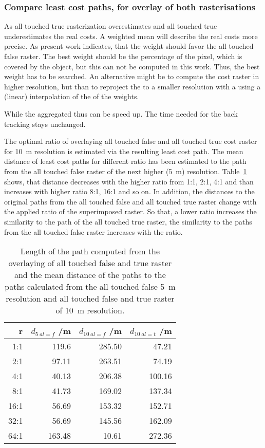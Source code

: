 \subsubsection{Compare least cost paths, for overlay of both rasterisations}

As all touched true rasterization overestimates and all touched true underestimates the real costs.
A weighted mean will describe the real costs more precise.
As present work indicates, that the weight should favor the all touched false raster.
The best weight should be the percentage of the pixel, which is covered by the object, but this can not be computed in this work.
Thus, the best weight has to be searched.
An alternative might be to compute the cost raster in higher resolution, but than to reproject the to a smaller resolution with a using a (linear) interpolation of the of the weights.

While the aggregated thus can be speed up.
The time needed for the back tracking stays unchanged.

The optimal ratio of overlaying all touched false and all touched true cost raster for 10~m resolution is estimated via the resulting least cost path. 
The mean distance of least cost paths for different ratio has been estimated to the path from the all touched false raster of the next higher (5~m) resolution. 
Table~\ref{tab:4} shows, that distance decreases with the higher ratio from 1:1, 2:1, 4:1 and than increases with higher ratio 8:1, 16:1 and so on.
In addition, the distances to the original paths from the all touched false and all touched true raster change with the applied ratio of the superimposed raster.
So that, a lower ratio increases the similarity to the path of the all touched true raster, the similarity to the paths from the all touched false raster increases with the ratio.

\begin{table}[h!]
	\caption{Length of the path computed from the overlaying of all touched false and true raster and the mean distance of the paths to the paths calculated from the all touched false 5~m resolution  and all touched false and true raster of 10~m resolution.}
	\label{tab:4}
	\centering
	\begin{tabular}{ r  r  r  r}
		r & $d_{5~al=f}$ /m &  $d_{10~al=f}$ /m & $d_{10~al=t}$ /m \\
		\hline
		
		  1:1  &    119.6 &  285.50 &  47.21\\
		  2:1  &    97.11 &  263.51 &  74.19\\
		  4:1  &    40.13 &  206.38 & 100.16\\
		  8:1  &    41.73 &  169.02 & 137.34\\
		 16:1  &    56.69 &  153.32 & 152.71\\
		 32:1  &    56.69 &  145.56 & 162.09\\
		 64:1  &   163.48 &   10.61 & 272.36\\
		
	\end{tabular}
\end{table}


